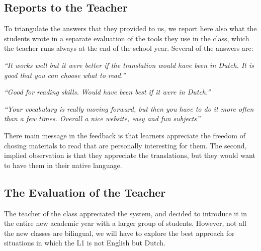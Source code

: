\newpage
\subsection{Reports to the Teacher}
To triangulate the answers that they provided to us, we report here also what the students wrote in a separate evaluation of the tools they use in the class, which the teacher runs always at the end of the school year. Several of the answers are: 

\begin{description}
  \item {\em ``It works well but it were better if the translation would have been in Dutch. It is good that you can choose what to read.''}
  \item {\em ``Good for reading skills. Would have been best if it were in Dutch.''}
  \item {\em ``Your vocabulary is really moving forward, but then you have to do it more often than a few times. Overall a nice website, easy and fun subjects''}
\end{description}

There main message in the feedback is that learners appreciate the freedom of chosing materials to read that are personally interesting for them. The second, implied observation is that they appreciate the translations, but they would want to have them in their native language. 

\subsection{The Evaluation of the Teacher}
The teacher of the class appreciated the system, and decided to introduce it in the entire new academic year with a larger group of students. However, not all the new classes are bilingual, we will have to explore the best approach for situations in which the L1 is not English but Dutch.



